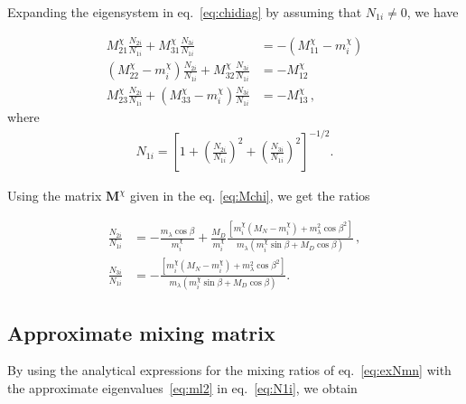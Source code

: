 Expanding the eigensystem in eq.~\eqref{eq:chidiag} by  assuming  that ${N}_{1i}\neq 0$, we have 

\begin{align*}
{M}^{\chi}_{21}\frac{{N}_{2i}}{{N}_{1i}}+{M}^{\chi}_{31}\frac{{N}_{3i}}{{N}_{1i}}&=-({M}^{\chi}_{11}-m_i^\chi)\nonumber \\
({M}^{\chi}_{22}-m_i^\chi)\frac{{N}_{2i}}{{N}_{1i}}+{M}^{\chi}_{32}\frac{{N}_{3i}}{{N}_{1i}}&=-{M}^{\chi}_{12} \nonumber\\
{M}^{\chi}_{23}\frac{{N}_{2i}}{{N}_{1i}}+({M}^{\chi}_{33}-m_i^\chi)\frac{{N}_{3i}}{{N}_{1i}}&=-{M}^{\chi}_{13}\,,
\end{align*}
where
\begin{align}
\label{eq:N1i}
{N}_{1i}=\left[1+\left(\frac{{N}_{2i}}{{N}_{1i}}\right)^2+\left(\frac{{N}_{3i}}{{N}_{1i}}\right)^2\right]^{-1/2}.
\end{align}

Using the matrix $\textbf{M}^{\chi}$ given in the eq. \eqref{eq:Mchi}, we get the ratios

\begin{align}
\label{eq:exNmn}
\frac{{N}_{2i}}{{N}_{1i}}
&=-\frac{m_{\lambda} \cos\beta}{m_i^\chi}+\frac{M_D}{m_i^\chi}\frac{[m_i^\chi(M_N-m_i^\chi)+m_{\lambda}^2\cos\beta^2 ]}{m_{\lambda}(m_i^\chi\sin\beta +M_D\cos\beta )}\,, \nonumber\\  
\frac{{N}_{3i}}{{N}_{1i}}
&=-\frac{[m_i^\chi(M_N-m_i^\chi)+m_{\lambda}^2 \cos\beta^2]}{m_{\lambda} (m_i^\chi\sin\beta+M_D\cos\beta)}.
\end{align}


\subsection{Approximate mixing matrix}
By using the analytical expressions for the mixing ratios of
eq.~\eqref{eq:exNmn} with the approximate eigenvalues~\eqref{eq:ml2}
in eq.~\eqref{eq:N1i}, we obtain

